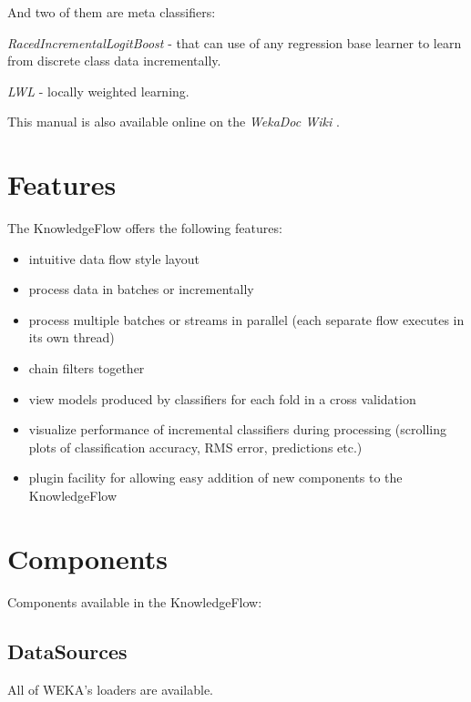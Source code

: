 \documentclass[a4paper]{article}
\newenvironment{tight_itemize}{
\begin{itemize}
  \setlength{\itemsep}{1pt}
  \setlength{\parskip}{0pt}
  \setlength{\parsep}{0pt}}{\end{itemize}
}
\begin{document}
\noindent And two of them are meta classifiers:
\begin{tight_itemize}
	\item \textit{RacedIncrementalLogitBoost} - that can use of any regression base
learner to learn from discrete class data incrementally.
	\item \textit{LWL} - locally weighted learning.
\end{tight_itemize}

\noindent This manual is also available online on the \textit{WekaDoc Wiki} \cite{wekadoc}.


\newpage
\section{Features}

The KnowledgeFlow offers the following features:
\begin{itemize}
	\item intuitive data flow style layout
	\item process data in batches or incrementally 
	\item process multiple batches or streams in parallel (each separate flow 
  	executes in its own thread)
	\item chain filters together
	\item view models produced by classifiers for each fold in a cross validation
	\item visualize performance of incremental classifiers during 
  	processing (scrolling plots of classification accuracy, RMS error, 
  	predictions etc.)
        \item plugin facility for allowing easy addition of new components
        to the KnowledgeFlow
\end{itemize}

\newpage
\section{Components}
Components available in the KnowledgeFlow:

\subsection{DataSources} All of WEKA's loaders are available.
\begin{center}
\end{center}
\end{document}
